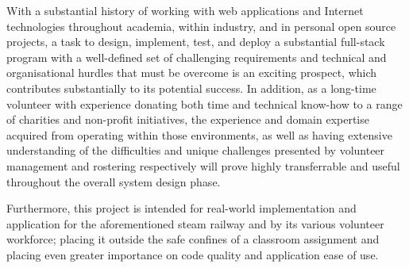 With a substantial history of working with web applications and Internet technologies throughout academia, within industry, and in personal open source projects, a task to design, implement, test, and deploy a substantial full-stack program with a well-defined set of challenging requirements and technical and organisational hurdles that must be overcome is an exciting prospect, which contributes substantially to its potential success. In addition, as a long-time volunteer with experience donating both time and technical know-how to a range of charities and non-profit initiatives, the experience and domain expertise acquired from operating within those environments, as well as  having extensive understanding of the difficulties and unique challenges presented by volunteer management and rostering respectively will prove highly transferrable and useful throughout the overall system design phase.

Furthermore, this project is intended for real-world implementation and application for the aforementioned steam railway and by its various volunteer workforce; placing it outside the safe confines of a classroom assignment and placing even greater importance on code quality and application ease of use.
